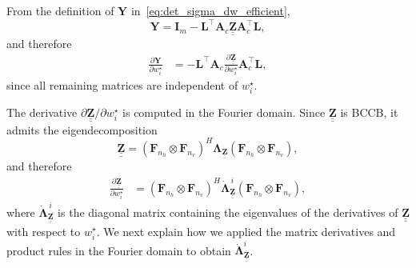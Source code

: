 \documentclass[12pt]{article}
\newcommand{\mybcirc}[1] {\underline{\underline{\bm{#1}}}}
\begin{document}
From the definition of $\bm{Y}$ in~\eqref{eq:det_sigma_dw_efficient},
\begin{equation}
    \bm{Y}
    =
    \bm{I}_m
    -
    \bm{L}^{\top}
    \bm{A}_c
    \mybcirc{Z}
    \bm{A}_c^{\top}
    \bm{L},
\end{equation}
and therefore
\begin{equation}
\label{eq:gradient_logdet_Y_derivative}
\begin{split}
    \frac{\partial \bm{Y}}
    {\partial w_i^\star}
    &=
    -\bm{L}^{\top}
    \bm{A}_c
    \frac{\partial \mybcirc{Z}}
    {\partial w_i^\star}
    \bm{A}_c^{\top}
    \bm{L},
\end{split}
\end{equation}
since all remaining matrices are independent of $w_i^\star$.

The derivative
$\partial \mybcirc{Z}/\partial w_i^\star$
is computed in the Fourier domain. Since $\mybcirc{Z}$ is BCCB, it admits the eigendecomposition
\begin{equation}
    \mybcirc{Z}
    =
    (\bm{F}_{n_h}\otimes\bm{F}_{n_v})^{H}
    \bm{\Lambda}_{\mybcirc{Z}}
    (\bm{F}_{n_h}\otimes\bm{F}_{n_v}),
\end{equation}
and therefore
\begin{equation}
\begin{split}
    \frac{\partial \mybcirc{Z}}
    {\partial w_i^\star}
    &=
    (\bm{F}_{n_h}\otimes\bm{F}_{n_v})^{H}
    \dot{\bm{\Lambda}}_{\mybcirc{Z}}^{\,i}
    (\bm{F}_{n_h}\otimes\bm{F}_{n_v}),
\end{split}
\end{equation}
where
$\dot{\bm{\Lambda}}_{\mybcirc{Z}}^{\,i}$
is the diagonal matrix containing the eigenvalues of the derivatives of $\mybcirc{Z}$ with respect to $w_i^\star$. We next explain how we applied the matrix derivatives and product rules in the Fourier domain to obtain $\dot{\bm{\Lambda}}_{\mybcirc{Z}}^{i}$.
\end{document}
